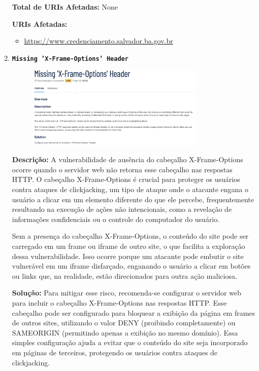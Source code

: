 \documentclass[a4paper,12pt]{article}
\begin{document}
\begin{enumerate}
\textbf{Total de URIs Afetadas:} None

\textbf{URIs Afetadas:}
\begin{itemize}
    \item \url{https://www.credenciamento.salvador.ba.gov.br}
\end{itemize}

\item \textbf{\texttt{Missing 'X-Frame-Options' Header}}

                        \begin{figure}[h!]
                        \centering
                        \includegraphics[width=0.8\textwidth]{assets/images-was/Vulnerabilidades Relacionadas a Configurações de Segurança HTTP E TLS/Missing 'X-Frame-Options' Header.png}
                        \end{figure}
                        \FloatBarrier
                        \textbf{Descrição:} A vulnerabilidade de ausência do cabeçalho X-Frame-Options ocorre quando o servidor web não retorna esse cabeçalho nas respostas HTTP. O cabeçalho X-Frame-Options é crucial para proteger os usuários contra ataques de clickjacking, um tipo de ataque onde o atacante engana o usuário a clicar em um elemento diferente do que ele percebe, frequentemente resultando na execução de ações não intencionais, como a revelação de informações confidenciais ou o controle do computador do usuário.

Sem a presença do cabeçalho X-Frame-Options, o conteúdo do site pode ser carregado em um frame ou iframe de outro site, o que facilita a exploração dessa vulnerabilidade. Isso ocorre porque um atacante pode embutir o site vulnerável em um iframe disfarçado, enganando o usuário a clicar em botões ou links que, na realidade, estão direcionados para outra ação maliciosa.

\textbf{Solução:} Para mitigar esse risco, recomenda-se configurar o servidor web para incluir o cabeçalho X-Frame-Options nas respostas HTTP. Esse cabeçalho pode ser configurado para bloquear a exibição da página em frames de outros sites, utilizando o valor DENY (proibindo completamente) ou SAMEORIGIN (permitindo apenas a exibição no mesmo domínio). Essa simples configuração ajuda a evitar que o conteúdo do site seja incorporado em páginas de terceiros, protegendo os usuários contra ataques de clickjacking.


\end{enumerate}
\end{document}
